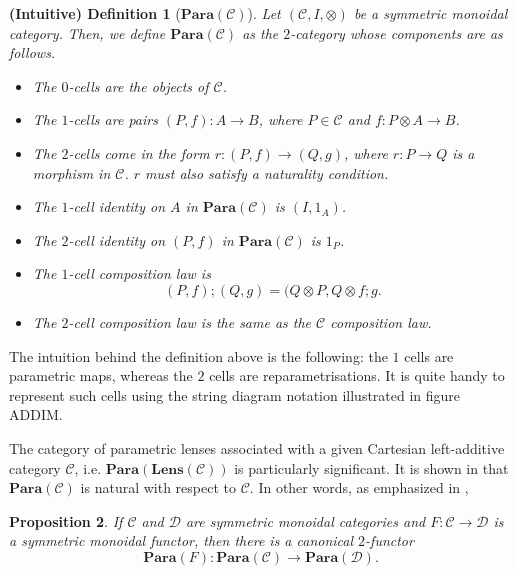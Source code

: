 \documentclass[12pt,a4paper,openright,twoside]{report}
\theoremstyle{plain}
\newtheorem{prop}{Proposition}
\newtheorem{intdef}[prop]{(Intuitive) Definition}
\theoremstyle{definition}
\begin{document}
  \begin{intdef}[$\mathbf{Para}(\mathcal{C})$]
    Let $(\mathcal{C},I,\otimes)$ be a symmetric monoidal category. Then, we define $\mathbf{Para}(\mathcal{C})$ as the $2$-category whose components are as follows.
    \begin{itemize}
      \item The $0$-cells are the objects of $\mathcal{C}$.
      \item The $1$-cells are pairs $(P,f): A \to B$, where $P \in \mathcal{C}$ and $f: P \otimes A \to B$.
      \item The $2$-cells come in the form $r: (P,f) \to (Q,g)$, where $r: P \to Q$ is a morphism in $\mathcal{C}$. $r$ must also satisfy a naturality condition.
      \item The $1$-cell identity on $A$ in $\mathbf{Para}(\mathcal{C})$ is $(I,1_A)$.
      \item The $2$-cell identity on $(P,f)$ in $\mathbf{Para}(\mathcal{C})$ is $1_P$.
      \item The $1$-cell composition law is
        \[(P,f) ; (Q,g) = (Q \otimes P, Q \otimes f ; g.\]
      \item The $2$-cell composition law is the same as the $\mathcal{C}$ composition law.
    \end{itemize}
     
  \end{intdef}

  The intuition behind the definition above is the following: the $1$ cells are parametric maps, whereas the $2$ cells are reparametrisations.
  It is quite handy to represent such cells using the string diagram notation illustrated in figure ADDIM.
  
  
  The category of parametric lenses associated with a given Cartesian left-additive category $\mathcal{C}$, i.e. $\mathbf{Para}(\mathbf{Lens}(\mathcal{C}))$ is particularly significant. It is shown in \cite{cruttwellDeepLearningParametric} that $\mathbf{Para}(\mathcal{C})$ is natural with respect to $\mathcal{C}$. In other words, as emphasized in \cite{shieblerCategoryTheoryMachine2021},
  
  \begin{prop}\label{prop: canembedding2}
    If $\mathcal{C}$ and $\mathcal{D}$ are symmetric monoidal categories and $F: \mathcal{C} \to \mathcal{D}$ is a symmetric monoidal functor, then  there is a canonical $2$-functor 
    \[\mathbf{Para}(F): \mathbf{Para}(\mathcal{C}) \to \mathbf{Para}(\mathcal{D}).\]
  \end{prop}
\end{document}
